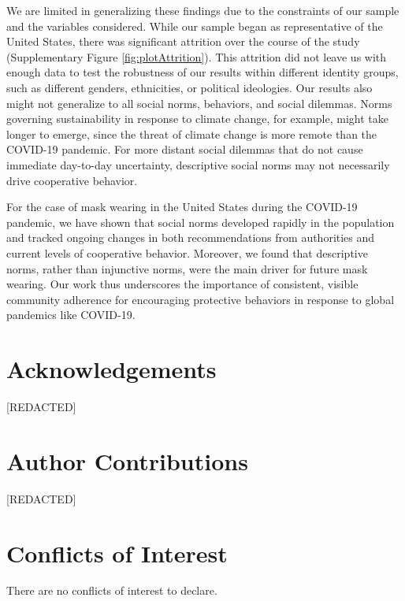 \documentclass[
  man, donotrepeattitle,mask,floatsintext]{apa6}
\begin{document}
We are limited in generalizing these findings due to the constraints of our sample and the variables considered. While our sample began as representative of the United States, there was significant attrition over the course of the study (Supplementary Figure \ref{fig:plotAttrition}). This attrition did not leave us with enough data to test the robustness of our results within different identity groups, such as different genders, ethnicities, or political ideologies. Our results also might not generalize to all social norms, behaviors, and social dilemmas. Norms governing sustainability in response to climate change, for example, might take longer to emerge, since the threat of climate change is more remote than the COVID-19 pandemic. For more distant social dilemmas that do not cause immediate day-to-day uncertainty, descriptive social norms may not necessarily drive cooperative behavior.

For the case of mask wearing in the United States during the COVID-19 pandemic, we have shown that social norms developed rapidly in the population and tracked ongoing changes in both recommendations from authorities and current levels of cooperative behavior. Moreover, we found that descriptive norms, rather than injunctive norms, were the main driver for future mask wearing. Our work thus underscores the importance of consistent, visible community adherence for encouraging protective behaviors in response to global pandemics like COVID-19.

\newpage

\hypertarget{acknowledgements}{%
\section{Acknowledgements}\label{acknowledgements}}

{[}REDACTED{]}

\hypertarget{author-contributions}{%
\section{Author Contributions}\label{author-contributions}}

{[}REDACTED{]}

\hypertarget{conflicts-of-interest}{%
\section{Conflicts of Interest}\label{conflicts-of-interest}}

There are no conflicts of interest to declare.
\end{document}
